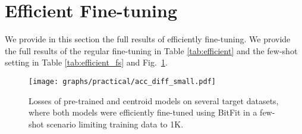 \documentclass[nohyperref]{article}
\theoremstyle{plain}
\theoremstyle{definition}
\theoremstyle{remark}
\begin{document}
\begin{figure*}[t]
\centering
{}
\hfill
{}
\caption{Losses of linearly extrapolation models created between pairs of similar models. In each figure, the solid line is the average losses during extrapolations for different $ \alpha $ values, the vertical dashed lines indicate the average loss of the pure models we extrapolate ($\alpha=0$ or $\alpha=1$), Y axis is the average loss value, X axis is the position (meaning the $ \alpha$ and $(1-\alpha)$ values used in the extrapolation), N is the number of pairs we extrapolated between, the values on top of the line are the loss at the edges and at the minimum average loss during the extrapolation, and the shade is the standard deviation of the losses average. Each Column represents extrapolation between different types of models and each row evaluates those same models and their extrapolations on a different target tasks.} 
\label{fig:extrapolation_all}
\end{figure*}




\section{Efficient Fine-tuning}\label{ap:sec:bitfit}
We provide in this section the full results of efficiently fine-tuning. We provide the full results of the regular fine-tuning in Table \ref{tab:efficient} and the few-shot setting in Table \ref{tab:efficient_fs} and Fig.~\ref{fig:bitfit_small}.



\begin{figure}[t]
\centering
    \texttt{[image: graphs/practical/acc\_diff\_small.pdf]}
    
\caption{Losses of pre-trained and centroid models on several target datasets, where both models were efficiently fine-tuned using BitFit in a few-shot scenario limiting training data to 1K.\label{fig:bitfit_small}}
\end{figure}
\end{document}
